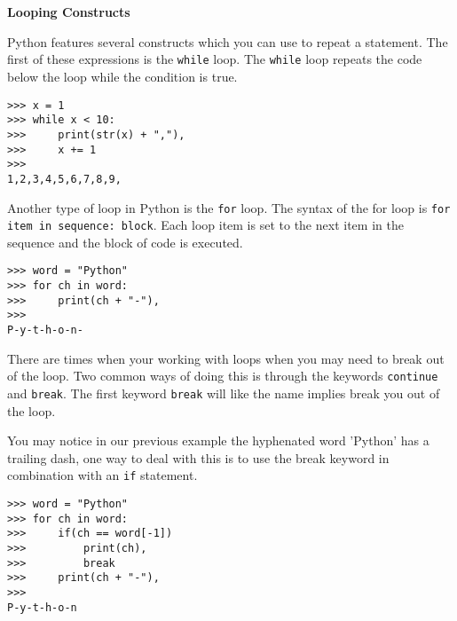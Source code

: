 \documentclass[letterpaper,11pt]{article}
\begin{document}
\\ \\
\textbf{Looping Constructs}
\par{Python features several constructs which you can use to repeat a statement.
The first of these expressions is the \texttt{while} loop. The \texttt{while}
loop repeats the code below the loop while the condition is true.}
\\
\begin{minipage}{.5\textwidth}
    \begin{tcolorbox}
        \begin{footnotesize}
            \begin{verbatim}
>>> x = 1
>>> while x < 10:
>>>     print(str(x) + ","),
>>>     x += 1
>>>
1,2,3,4,5,6,7,8,9,
            \end{verbatim}
        \end{footnotesize}
    \end{tcolorbox}
\end{minipage}
\par{Another type of loop in Python is the \texttt{for} loop. The syntax of the
for loop is \texttt{for item in sequence: block}. Each loop item is set to the
next item in the sequence and the block of code is executed.}
\\
\begin{minipage}{.5\textwidth}
    \begin{tcolorbox}
        \begin{footnotesize}
            \begin{verbatim}
>>> word = "Python"
>>> for ch in word:
>>>     print(ch + "-"),
>>>
P-y-t-h-o-n-
            \end{verbatim}
        \end{footnotesize}
    \end{tcolorbox}
\end{minipage}
\par{There are times when your working with loops when you may need to break out
of the loop. Two common ways of doing this is through the keywords
\texttt{continue} and \texttt{break}. The first keyword \texttt{break} will like
the name implies break you out of the loop.}
\par{You may notice in our previous example the hyphenated word 'Python' has
a trailing dash, one way to deal with this is to use the break keyword in
combination with an \texttt{if} statement.} 
\\
\begin{minipage}{.5\textwidth}
    \begin{tcolorbox}
        \begin{footnotesize}
            \begin{verbatim}
>>> word = "Python"
>>> for ch in word:
>>>     if(ch == word[-1])
>>>         print(ch), 
>>>         break
>>>     print(ch + "-"),
>>>
P-y-t-h-o-n
            \end{verbatim}
        \end{footnotesize}
    \end{tcolorbox}
\end{minipage}
\end{document}
